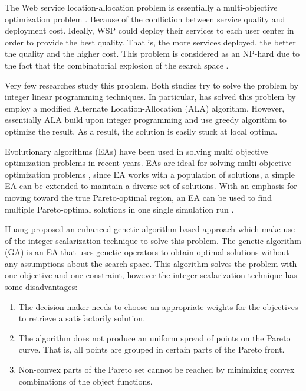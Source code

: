 \documentclass{llncs}
\begin{document}
The Web service location-allocation problem is essentially a multi-objective optimization problem \cite{Multiobjective}.
Because of the confliction between service quality and deployment cost. 
Ideally, WSP could deploy their services to each user center in order to provide the best quality.
That is, the more services deployed, the better the quality and the higher cost. 
This problem is considered as an NP-hard due to the fact that the combinatorial explosion of the search space \cite{Vanrompay}. 


Very few researches \cite{Aboolian} \cite{Sun} study this problem.
Both studies try to solve the problem by integer linear programming techniques.
In particular, \cite{Sun} has solved this problem by employ a modified Alternate Location-Allocation (ALA) algorithm. 
However, essentially ALA build upon integer programming and use greedy algorithm to optimize the result. 
As a result, the solution is easily stuck at local optima.

Evolutionary algorithms (EAs) have been used in solving multi objective optimization problems in recent years. 
EAs are ideal for solving multi objective optimization problems \cite{key:article}, since EA works with a population of solutions, 
a simple EA can be extended to maintain a diverse set of solutions.
With an emphasis for moving toward the true Pareto-optimal region, an EA can be used to find multiple Pareto-optimal solutions in one single simulation run \cite{OptimizationElectrical}.

Huang \cite{EnhancedGenetic} proposed an enhanced genetic algorithm-based approach which make use of the integer scalarization technique to solve this problem.
The genetic algorithm (GA) is an EA that uses genetic operators to obtain optimal solutions without any assumptions about the search space.
This algorithm solves the problem with one objective and one constraint, however the integer scalarization technique \cite{Multiobjective} has some disadvantages: 

\begin{enumerate}
	\item The decision maker needs to choose an appropriate weights for the objectives to retrieve a satisfactorily solution.
	\item The algorithm does not produce an uniform spread of points on the Pareto curve. That is, all points are grouped in certain parts of the Pareto front.
	\item Non-convex parts of the Pareto set cannot be reached by minimizing convex combinations of the object functions.
\end{enumerate}
\end{document}

